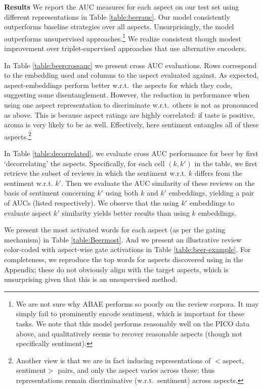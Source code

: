 \documentclass[11pt,a4paper]{article}
\begin{document}
\vspace{.25em}
\noindent \textbf{Results} We report the AUC measures for each aspect on our test set using different representations in Table \ref{table:beerauc}. Our model consistently outperforms baseline strategies over all aspects. Unsurprisingly, the model outperforms unsupervised approaches.\footnote{We are not sure why ABAE \cite{he-2017} performs so poorly on the review corpora. It may simply fail to prominently encode sentiment, which is important for these tasks. We note that this model performs reasonably well on the PICO data above, and qualitatively seems to recover reasonable aspects (though not specifically sentiment).} We realize consistent though modest improvement over triplet-supervised approaches that use alternative encoders. %

In Table \ref{table:beercrossauc} we present cross AUC evaluations. Rows correspond to the embedding used and columns to the aspect evaluated against. As expected, aspect-embeddings perform better w.r.t.~the aspects for which they code, suggesting some disentanglement. However, the reduction in performance when using one aspect representation to discriminate w.r.t.~others is not as pronounced as above. This is because aspect ratings are highly correlated: if taste is positive, aroma is very likely to be as well. Effectively, here sentiment entangles all of these aspects.\footnote{Another view is that we are in fact inducing representations of $<$aspect, sentiment$>$ pairs, and only the aspect varies across these; thus representations remain discriminative (w.r.t.~sentiment) across aspects.} 

In Table \ref{table:decorrelated}, we evaluate cross AUC performance for beer by first `decorrelating' the aspects. Specifically, for each cell $(k, k')$ in the table, we first retrieve the subset of reviews in which the sentiment w.r.t. $k$ differs from the sentiment w.r.t. $k'$. Then we evaluate the AUC similarity of these reviews on the basis of sentiment concerning $k'$ using both $k$ and $k'$ embeddings, yielding a pair of AUCs (listed respectively). We observe that the using $k'$ embeddings to evaluate aspect $k'$ similarity yields better results than using $k$ embeddings.

We present the most activated words for each aspect (as per the gating mechanism) in Table \ref{table:Beermost}. And we present an illustrative review color-coded with aspect-wise gate activations in Table \ref{table:beer-example}. For completeness, we reproduce the top words for aspects discovered using  in the Appendix; these do not obviously align with the target aspects, which is unsurprising given that this is an unsupervised method.
\end{document}
